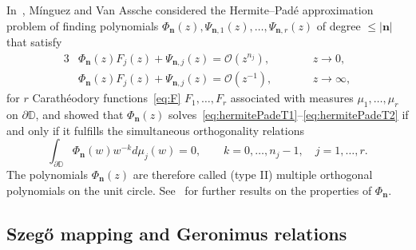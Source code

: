 \documentclass[reqno,centertags,11pt,draft]{amsart}
\newcommand{\T}{\mathbb{\partial\mathbb{D}}}
\begin{document}
In~\cite{MOPUC1}, M\'{i}nguez and Van Assche considered the Hermite--Pad\'{e} approximation problem of finding 
polynomials $\Phi_{\bm{n}}(z),\Psi_{\bm{n},1}(z),\ldots,\Psi_{\bm{n},r}(z)$ of degree $\le|\bm{n}|$ that satisfy
\begin{alignat}{3}
    \label{eq:hermitePadeT1}
    & \Phi_{\bm{n}}(z)F_j(z) + \Psi_{\bm{n},j}(z) = \mathcal{O}(z^{n_j}), \qquad  && z \rightarrow 0, 
    \\
    \label{eq:hermitePadeT2}
    & \Phi_{\bm{n}}(z)F_j(z) + \Psi_{\bm{n},j}(z) = \mathcal{O}(z^{-1}), \qquad  &&z \rightarrow \infty,
\end{alignat}
for $r$ Carath\'{e}odory functions~\eqref{eq:F} $F_1,\ldots,F_r$ associated with measures $\mu_1,\ldots,\mu_r$  on $\T$, and showed that $\Phi_{\bm{n}}(z)$ %
solves~\eqref{eq:hermitePadeT1}--\eqref{eq:hermitePadeT2} if and only if it
fulfills the simultaneous orthogonality relations
\begin{equation}\label{eq:MOPUC}
    \int_\T \Phi_{\bm{n}}(w) w^{-k}  d\mu_j(w) = 0,
    \qquad k = 0,\ldots,n_j-1, \quad j = 1,\ldots,r.
\end{equation}
The polynomials $\Phi_{\bm{n}}(z)$ are therefore  called (type II) multiple orthogonal polynomials on the unit circle. See~\cites{MOPUC1,MOPUC2,KVMOPUC} for further results on the properties of $\Phi_{\bm{n}}$. %

\subsection{Szeg\H{o} mapping and Geronimus relations}\label{ss:intro3}
\hfill\\
\end{document}
